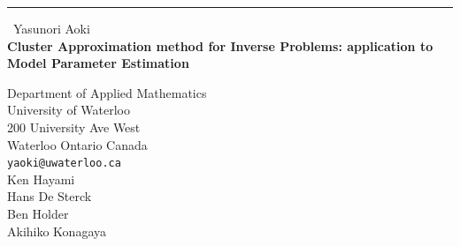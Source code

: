 \documentclass{report}
\begin{document}
\begin{center}
\rule{6in}{1pt} \
{\large Yasunori Aoki \\
{\bf Cluster Approximation method for Inverse Problems: application to Model Parameter Estimation}}

Department of Applied Mathematics \\ University of Waterloo \\ 200 University Ave West \\ Waterloo Ontario Canada
\\
{\tt yaoki@uwaterloo.ca}\\
Ken Hayami\\
Hans De Sterck\\
Ben Holder\\
Akihiko Konagaya\end{center}
\end{document}
